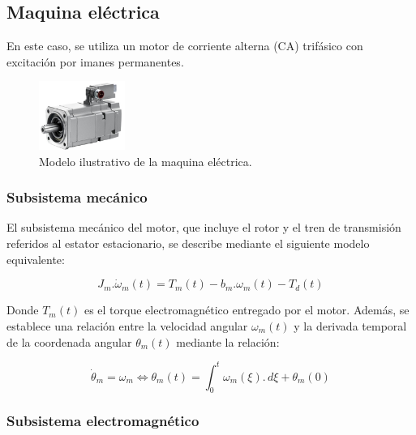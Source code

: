 \documentclass{article}
\begin{document}
\subsection{Maquina eléctrica}
    
    En este caso, se utiliza un motor de corriente alterna (CA) trifásico con excitación por imanes permanentes. 

    \begin{figure}[H]
        \centering
        \includegraphics[width=0.25\textwidth]{Alan3.jpg}
        \caption{Modelo ilustrativo de la maquina eléctrica.}
    \end{figure}

    \subsubsection{Subsistema mecánico}
        
        El subsistema mecánico del motor, que incluye el rotor y el tren de transmisión referidos 
        al estator estacionario, se describe mediante el siguiente modelo equivalente:
        
        \begin{equation}\label{eq:subsistema_macanico1}
            J_{m}.\dot{\omega}_{m}(t) = T_{m}(t)-b_{m}.\omega_{m}(t)-T_{d}(t)
        \end{equation}
        
        Donde $T_m(t)$ es el torque electromagnético entregado por el motor.
        Además, se establece una relación entre la velocidad angular $\omega_m(t)$ y la derivada temporal de la 
        coordenada angular $\theta_m(t)$ mediante la relación:
        
        \begin{equation}\label{eq:subsistema_mecanico2}
            \dot{\theta}_{m} = \omega_{m} \Leftrightarrow \theta_{m}(t) = \int_{0}^{t} \omega_{m}(\xi). \,d\xi + \theta_{m}(0)
        \end{equation}

    \subsubsection{Subsistema electromagnético}
        
\end{document}
